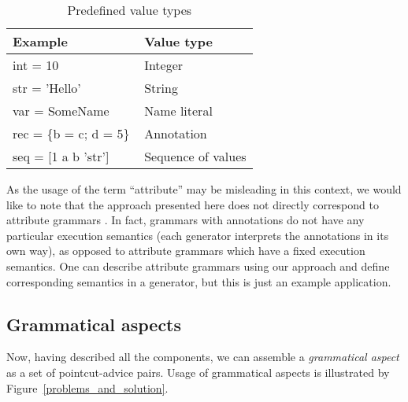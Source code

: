 \documentclass{IOS-Book-Article}     %
\newcommand{\figref}[1]{Figure~\ref{#1}}
\begin{document}
\begin{table}[h!]
\centering
\caption{Predefined value types}\label{value_types}
\begin{tabular}{|@{\tt\,\,}l|l|}
	\hline
	\bf Example & \bf Value type \\
	\hline
	int = 10 & Integer \\
	str = 'Hello' & String \\
	var = SomeName & Name literal\\
	rec = \{b = c; d = 5\}\, & Annotation\\
	seq = [1 a b 'str'] \,& Sequence of values \\
	\hline
\end{tabular}
\end{table}

As the usage of the term ``attribute'' may be misleading in this context, we would like to note that the approach presented here does not directly correspond to attribute grammars \cite{ATG}. In fact, grammars with annotations do not have any particular execution semantics (each generator interprets the annotations in its own way), as opposed to attribute grammars which have a fixed execution semantics. One can describe attribute grammars using our approach and define corresponding semantics in a generator, but this is just an example application.

\subsection{Grammatical aspects}
Now, having described all the components, we can assemble a \emph{grammatical aspect} as a set of pointcut-advice pairs.
Usage of grammatical aspects is illustrated by \figref{problems_and_solution}.
\end{document}

